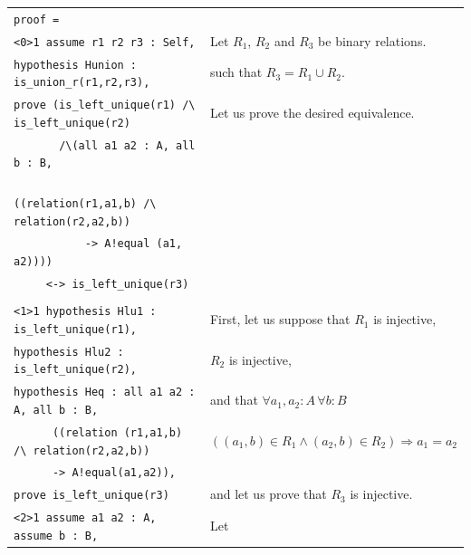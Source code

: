 \documentclass[submission,copyright,creativecommons]{eptcs}
\begin{document}
\begin{table}
\begin{center}
{\fontsize{7}{0.7em} \selectfont
\begin{tabular}{|ll|}
\hline
{\tt proof =} &\\
\hspace{0.2cm}  \verb+<0>1 assume r1 r2 r3 : Self,+ & Let
$R_1$, $R_2$ and $R_3$ be binary relations.\\
\hspace{1cm}  \verb+hypothesis Hunion : is_union_r(r1,r2,r3),+ &
such that $R_3 = R_1 \cup R_2$.\\
\hspace{1cm} \verb+prove (is_left_unique(r1) /\ is_left_unique(r2)+ &
Let us prove the desired equivalence.\\
\hspace{1cm}  \verb+       /\(all a1 a2 : A, all b : B,+ & \\
\hspace{1cm}  \verb+          ((relation(r1,a1,b) /\ relation(r2,a2,b))+ & \\
\hspace{1cm}  \verb+           -> A!equal (a1, a2))))+ & \\
\hspace{1cm}  \verb+     <-> is_left_unique(r3)+ & \\
\mbox{} & \\
\hspace{0.5cm}  \verb+<1>1 hypothesis Hlu1 : is_left_unique(r1),+ &
First, let us suppose that $R_1$ is injective, \\
\hspace{1.4cm}  \verb+hypothesis Hlu2 : is_left_unique(r2),+ & $R_2$
is injective, \\
\hspace{1.4cm}  \verb+hypothesis Heq : all a1 a2 : A, all b : B,+& 
and that $\forall a_1,a_2:A \, \forall b:B$ \\
\hspace{1.4cm}  \verb+      ((relation (r1,a1,b) /\ relation(r2,a2,b))+& 
$((a_1,b) \in R_1 \land (a_2,b) \in R_2) \Rightarrow a_1=a_2$\\
\hspace{1.4cm}  \verb+      -> A!equal(a1,a2)),+ & \\
\hspace{1.4cm}  \verb+prove is_left_unique(r3)+ & and let us prove
that $R_3$ is injective.\\
\hspace{0.8cm}  \verb+<2>1 assume a1 a2 : A, assume b : B,+ & Let

\end{tabular}}
\end{center}
\end{table}
\end{document}
